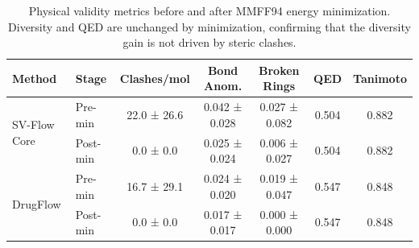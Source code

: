 \begin{table}[t]
\centering
\caption{Physical validity metrics before and after MMFF94 energy minimization.
         Diversity and QED are unchanged by minimization, confirming that
         the diversity gain is not driven by steric clashes.}
\label{tab:min}
\begin{tabular}{llccccc}
\toprule
\textbf{Method} & \textbf{Stage} & \textbf{Clashes/mol} & \textbf{Bond Anom.} &
\textbf{Broken Rings} & \textbf{QED} & \textbf{Tanimoto} \\
\midrule
\multirow{2}{*}{SV-Flow Core}
    & Pre-min  & 22.0 ± 26.6
               & 0.042 ± 0.028
               & 0.027 ± 0.082
               & 0.504
               & 0.882 \\
    & Post-min & 0.0 ± 0.0
               & 0.025 ± 0.024
               & 0.006 ± 0.027
               & 0.504
               & 0.882 \\
\midrule
\multirow{2}{*}{DrugFlow}
    & Pre-min  & 16.7 ± 29.1
               & 0.024 ± 0.020
               & 0.019 ± 0.047
               & 0.547
               & 0.848 \\
    & Post-min & 0.0 ± 0.0
               & 0.017 ± 0.017
               & 0.000 ± 0.000
               & 0.547
               & 0.848 \\
\bottomrule
\end{tabular}
\end{table}
